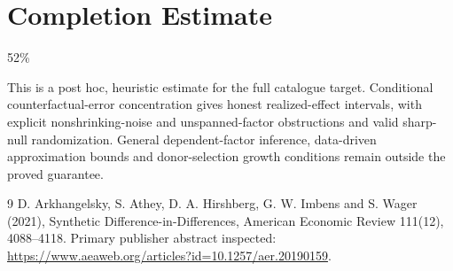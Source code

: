 \documentclass[11pt]{article}
\begin{document}
\section{Completion Estimate}
52\%

This is a post hoc, heuristic estimate for the full catalogue target.
Conditional counterfactual-error concentration gives honest realized-effect intervals, with explicit nonshrinking-noise and unspanned-factor obstructions and valid sharp-null randomization. General dependent-factor inference, data-driven approximation bounds and donor-selection growth conditions remain outside the proved guarantee.

\begin{thebibliography}{9}
 D. Arkhangelsky, S. Athey, D. A. Hirshberg, G. W. Imbens and S. Wager (2021), Synthetic Difference-in-Differences, American Economic Review 111(12), 4088--4118. Primary publisher abstract inspected:
\url{https://www.aeaweb.org/articles?id=10.1257/aer.20190159}.
\end{thebibliography}
\end{document}
